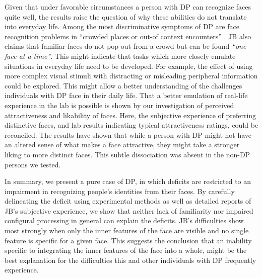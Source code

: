 \documentclass[fleqn,10pt]{SelfArx} %
\begin{document}
Given that under favorable circumstances a person with DP can recognize faces quite well, the results raise the question of why these abilities do not translate into everyday life. Among the most discriminative symptoms of DP are face recognition problems in “crowded places or out-of context encounters” \citep{Gr_ter_2008}. JB also claims that familiar faces do not pop out from a crowd but can be found \textit{“one face at a time”}. This might indicate that tasks which more closely emulate situations in everyday life need to be developed. For example, the effect of using more complex visual stimuli with distracting or misleading peripheral information could be explored. This might allow a better understanding of the challenges individuals with DP face in their daily life.
That a better emulation of real-life experience in the lab is possible is shown by our investigation of perceived attractiveness and likability of faces. Here, the subjective experience of preferring distinctive faces, and lab results indicating typical attractiveness ratings, could be reconciled. The results have shown that while a person with DP might not have an altered sense of what makes a face attractive, they might take a stronger liking to more distinct faces. This subtle dissociation was absent in the non-DP persons we tested.

In summary, we present a pure case of DP, in which deficits are restricted to an impairment in recognizing people's identities from their faces. By carefully delineating the deficit using experimental methods as well as detailed reports of JB's subjective experience, we show that neither lack of familiarity nor impaired configural processing in general can explain the deficits. JB's difficulties show most strongly when only the inner features of the face are visible and no single feature is specific for a given face. This suggests the conclusion that an inability specific to integrating the inner features of the face into a whole, might be the best explanation for the difficulties this and other individuals with DP frequently experience.
\end{document}
